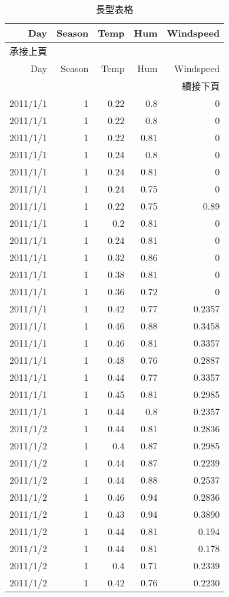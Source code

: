 \begin{longtable}{rrrrr}
\caption{長型表格}\label{longtable}\\
\toprule
Day & Season  & Temp & Hum &  Windspeed\\
\midrule
\endfirsthead
\multicolumn{5}{l}{承接上頁}\\
\toprule
Day & Season  & Temp & Hum &  Windspeed\\
\midrule
\endhead
\midrule
\multicolumn{5}{r}{續接下頁}
\endfoot
\endlastfoot
2011/1/1&1&0.24&0.81&0\\
2011/1/1&1&0.22&0.8&0\\
2011/1/1&1&0.22&0.8&0\\
2011/1/1&1&0.22&0.81&0\\
2011/1/1&1&0.24&0.8&0\\
2011/1/1&1&0.24&0.81&0\\
2011/1/1&1&0.24&0.75&0\\
2011/1/1&1&0.22&0.75&0.89\\
2011/1/1&1&0.2&0.81&0\\
2011/1/1&1&0.24&0.81&0\\
2011/1/1&1&0.32&0.86&0\\
2011/1/1&1&0.38&0.81&0\\
2011/1/1&1&0.36&0.72&0\\
2011/1/1&1&0.42&0.77&0.2357\\
2011/1/1&1&0.46&0.88&0.3458\\
2011/1/1&1&0.46&0.81&0.3357\\
2011/1/1&1&0.48&0.76&0.2887\\
2011/1/1&1&0.44&0.77&0.3357\\
2011/1/1&1&0.45&0.81&0.2985\\
2011/1/1&1&0.44&0.8&0.2357\\
2011/1/2&1&0.44&0.81&0.2836\\
2011/1/2&1&0.4&0.87&0.2985\\
2011/1/2&1&0.44&0.87&0.2239\\
2011/1/2&1&0.44&0.88&0.2537\\
2011/1/2&1&0.46&0.94&0.2836\\
2011/1/2&1&0.43&0.94&0.3890\\
2011/1/2&1&0.44&0.81&0.194\\
2011/1/2&1&0.44&0.81&0.178\\
2011/1/2&1&0.4&0.71&0.2339\\
2011/1/2&1&0.42&0.76&0.2230\\
\bottomrule
\end{longtable}

